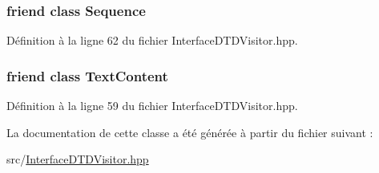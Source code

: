 \hypertarget{classdtd_1_1_interface_d_t_d_visitor_a26271d5afaff6e6d3f00c055c63d0b24}{
\subsubsection[{Sequence}]{\setlength{\rightskip}{0pt plus 5cm}friend class {\bf Sequence}}}
\label{classdtd_1_1_interface_d_t_d_visitor_a26271d5afaff6e6d3f00c055c63d0b24}


Définition à la ligne 62 du fichier InterfaceDTDVisitor.hpp.

\hypertarget{classdtd_1_1_interface_d_t_d_visitor_aa641efa971cba38c6181cdc71b30df90}{
\subsubsection[{TextContent}]{\setlength{\rightskip}{0pt plus 5cm}friend class {\bf TextContent}}}
\label{classdtd_1_1_interface_d_t_d_visitor_aa641efa971cba38c6181cdc71b30df90}


Définition à la ligne 59 du fichier InterfaceDTDVisitor.hpp.



La documentation de cette classe a été générée à partir du fichier suivant :\begin{DoxyCompactItemize}
\item 
src/\hyperlink{_interface_d_t_d_visitor_8hpp}{InterfaceDTDVisitor.hpp}\end{DoxyCompactItemize}
